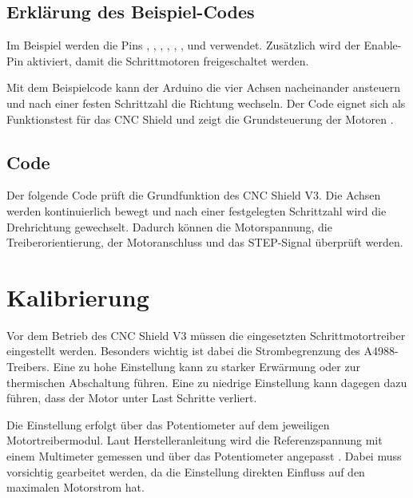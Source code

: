 \subsection{Erklärung des Beispiel-Codes}

Im Beispiel werden die Pins , , , , , ,  und  verwendet. Zusätzlich wird der Enable-Pin aktiviert, damit die Schrittmotoren freigeschaltet werden.

Mit dem Beispielcode kann der Arduino die vier Achsen nacheinander ansteuern und nach einer festen Schrittzahl die Richtung wechseln. Der Code eignet sich als Funktionstest für das CNC Shield und zeigt die Grundsteuerung der Motoren \cite{JoyIT:CNCShield:Anleitung}.

\subsection{Code}

Der folgende Code prüft die Grundfunktion des CNC Shield V3. Die Achsen werden kontinuierlich bewegt und nach einer festgelegten Schrittzahl wird die Drehrichtung gewechselt. Dadurch können die Motorspannung, die Treiberorientierung, der Motoranschluss und das STEP-Signal überprüft werden.

{
	\label{Code:CNCShieldFunctionTest}
}

\section{Kalibrierung}

Vor dem Betrieb des CNC Shield V3 müssen die eingesetzten Schrittmotortreiber eingestellt werden. Besonders wichtig ist dabei die Strombegrenzung des A4988-Treibers. Eine zu hohe Einstellung kann zu starker Erwärmung oder zur thermischen Abschaltung führen. Eine zu niedrige Einstellung kann dagegen dazu führen, dass der Motor unter Last Schritte verliert.

Die Einstellung erfolgt über das Potentiometer auf dem jeweiligen Motortreibermodul. Laut Herstelleranleitung wird die Referenzspannung mit einem Multimeter gemessen und über das Potentiometer angepasst \cite{JoyIT:CNCShield:Anleitung}. Dabei muss vorsichtig gearbeitet werden, da die Einstellung direkten Einfluss auf den maximalen Motorstrom hat.

